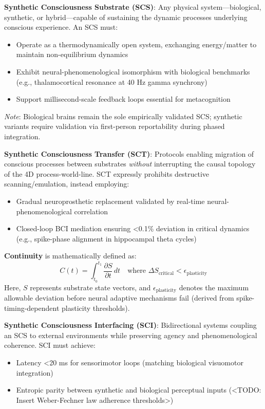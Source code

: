 \documentclass[10pt]{article}
\begin{document}
\begin{sloppypar}
  \textbf{Synthetic Consciousness Substrate (SCS)}: Any physical system—biological, synthetic, or hybrid—capable of sustaining the dynamic processes underlying conscious experience. An SCS must:
  \begin{itemize}
    \item Operate as a thermodynamically open system, exchanging energy/matter to maintain non-equilibrium dynamics
    \item Exhibit neural-phenomenological isomorphism with biological benchmarks (e.g., thalamocortical resonance at 40 Hz gamma synchrony)
    \item Support millisecond-scale feedback loops essential for metacognition
  \end{itemize}
  \textit{Note}: Biological brains remain the sole empirically validated SCS; synthetic variants require validation via first-person reportability during phased integration.

  \textbf{Synthetic Consciousness Transfer (SCT)}: Protocols enabling migration of conscious processes between substrates \textit{without} interrupting the causal topology of the 4D process-world-line. SCT expressly prohibits destructive scanning/emulation, instead employing:
  \begin{itemize}
    \item Gradual neuroprosthetic replacement validated by real-time neural-phenomenological correlation
    \item Closed-loop BCI mediation ensuring <0.1\% deviation in critical dynamics (e.g., spike-phase alignment in hippocampal theta cycles)
  \end{itemize}
  \textbf{Continuity} is mathematically defined as:
  \begin{equation}
    C(t) = \int_{t_0}^{t_1} \frac{\partial S}{\partial t} \, dt \quad \text{where } \Delta S_{\text{critical}} < \epsilon_{\text{plasticity}}
  \end{equation}
  Here, \( S \) represents substrate state vectors, and \( \epsilon_{\text{plasticity}} \) denotes the maximum allowable deviation before neural adaptive mechanisms fail (derived from spike-timing-dependent plasticity thresholds).

  \textbf{Synthetic Consciousness Interfacing (SCI)}: Bidirectional systems coupling an SCS to external environments while preserving agency and phenomenological coherence. SCI must achieve:
  \begin{itemize}
    \item Latency <20 ms for sensorimotor loops (matching biological visuomotor integration)
    \item Entropic parity between synthetic and biological perceptual inputs (<TODO: Insert Weber-Fechner law adherence thresholds>)
  \end{itemize}


\end{sloppypar}
\end{document}
